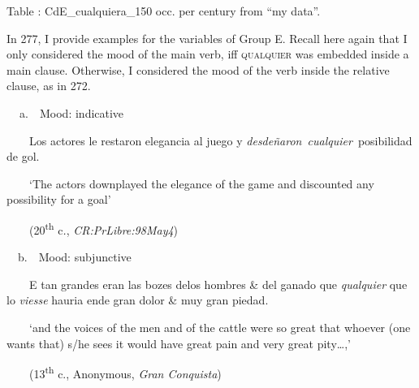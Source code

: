 \begin{styleStandard}
Table : CdE\_cualquiera\_150 occ. per century from “my data”.
\end{styleStandard}

\begin{styleStandard}
In 277, I provide examples for the variables of Group E. Recall here again that I only considered the mood of the main verb, iff \textsc{qualquier} was embedded inside a main clause. Otherwise, I considered the mood of the verb inside the relative clause, as in 272.
\end{styleStandard}

\begin{styleStandard}
\textbf{\ \ }a.\ \ Mood: indicative
\end{styleStandard}

\begin{styleStandard}
\ \ \ \ Los actores le restaron elegancia al juego y \textit{desdeñaron~cualquier}~posibilidad de gol. 
\end{styleStandard}

\begin{styleStandard}
\ \ \ \ ‘The actors downplayed the elegance of the game and discounted any possibility for a goal’
\end{styleStandard}

\begin{styleStandard}
\ \ \ \ (20\textsuperscript{th} c\textit{.},\textit{ CR:PrLibre:98May4})
\end{styleStandard}

\begin{styleStandard}
\ \ b.\ \ Mood: subjunctive
\end{styleStandard}

\begin{styleStandard}
\ \ \ \ E tan grandes eran las bozes delos hombres \& del ganado que \textit{qualquier} que lo \textit{viesse} hauria ende gran dolor \& muy gran piedad. 
\end{styleStandard}

\begin{styleStandard}
\ \ \ \ ‘and the voices of the men and of the cattle were so great that whoever (one wants that) s/he sees it would have great pain and very great pity…,’
\end{styleStandard}

\begin{styleStandard}
\ \ \ \ (13\textsuperscript{th} c., Anonymous, \textit{Gran Conquista})
\end{styleStandard}

